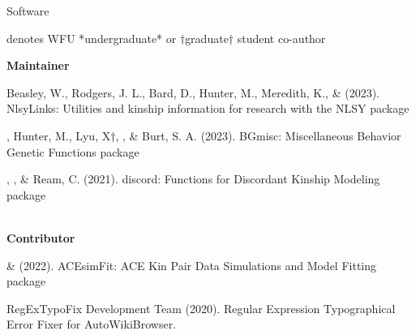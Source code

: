 \begin{rSection}{\textrm{Software}}%
\vspace{-1mm}\begin{center}\footnotesize{denotes WFU *undergraduate* or $\dagger$graduate$\dagger$ student co-author}\end{center}\vspace{-1mm}

{\large \textbf {Maintainer}}%
\begin{etaremune}

\item  Beasley, W., Rodgers, J. L., Bard, D., Hunter, M., Meredith, K., \& \meb  (2023). NlsyLinks: Utilities and kinship information for research with the NLSY \R package 

\item\meb, Hunter, M., Lyu, X$\dagger$, \jt, \& Burt, S. A. (2023). BGmisc: Miscellaneous Behavior Genetic Functions \R package %

\item\meb, \jt, \& Ream, C. (2021). discord: Functions for Discordant Kinship Modeling \R package 
%
%


\smallskip\\
\hspace*{-8mm}\large{\bf{Contributor}}
\item \xyl  \& \meb (2022). ACEsimFit: ACE Kin Pair Data Simulations and Model Fitting \R package 


\item RegExTypoFix Development Team (2020). Regular Expression Typographical Error Fixer for Auto\allowbreak WikiBrowser. 
%
%
%
\end{etaremune}
\end{rSection}
